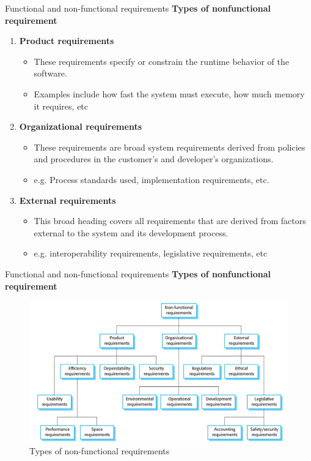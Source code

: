 \documentclass{beamer}
\begin{document}
\begin{frame}{Functional and non-functional requirements}
	\textbf{Types of nonfunctional requirement}
\begin{enumerate}
	\item \textbf{Product requirements }
	\begin{itemize}
		\item These requirements specify or constrain the runtime 
		behavior of the software.
		\item Examples include how fast the system must execute, how much memory 
		it requires, etc
	\end{itemize}
	\item \textbf{Organizational requirements}
	\begin{itemize}
		\item These requirements are broad system requirements derived from policies and procedures in the customer’s and developer’s 
		organizations.
		\item e.g. Process 
		standards used, implementation requirements, etc.
	\end{itemize}
\item \textbf{External requirements}
\begin{itemize}
	\item This broad heading covers all requirements that are 
	derived from factors external to the system and its development process.
	\item e.g. interoperability requirements, legislative 
	requirements, etc 
\end{itemize}
\end{enumerate}
\end{frame}
\begin{frame}{Functional and non-functional requirements}
	\textbf{Types of nonfunctional requirement}
	\begin{figure}
		\includegraphics[scale=.4]{img/m2_2.jpg}
		\caption{Types of non-functional requirements}
	\end{figure}
\end{frame}
\end{document}

